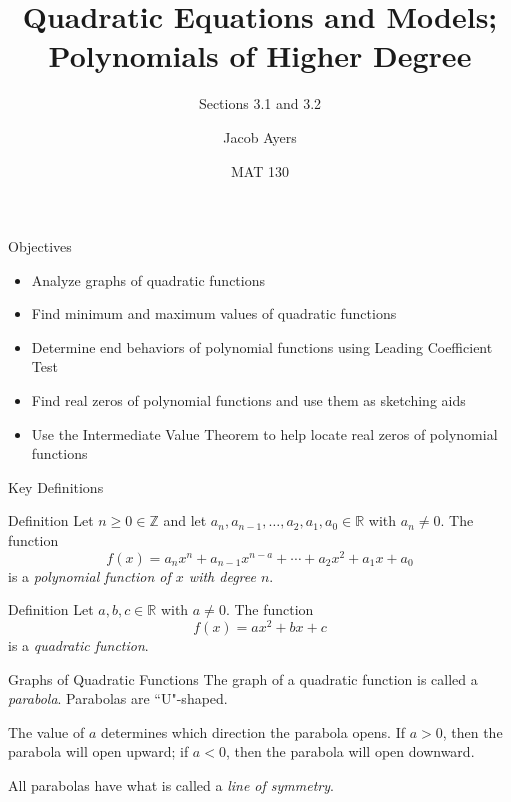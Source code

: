 \documentclass{beamer}
\title[3.1 and 3.2]{Quadratic Equations and Models; Polynomials of Higher Degree}
\subtitle{Sections 3.1 and 3.2}
\author{Jacob Ayers}
\institute{Lesson \#11}
\date{MAT 130}
\def\R{\mathbb{R}} %
\def\Z{\mathbb{Z}} %
\begin{document}
\begin{frame}
\titlepage
\end{frame}

\begin{frame}[t]{Objectives}
\begin{itemize}
	\item Analyze graphs of quadratic functions
	\item Find minimum and maximum values of quadratic functions
	\item Determine end behaviors of polynomial functions using Leading Coefficient Test
	\item Find real zeros of polynomial functions and use them as sketching aids
	\item Use the Intermediate Value Theorem to help locate real zeros of polynomial functions
\end{itemize}
\end{frame}

\begin{frame}[t]{Key Definitions}
\begin{block}{Definition}
Let $n \geq 0 \in \Z$ and let $a_n,a_{n-1},\dots,a_2,a_1,a_0 \in \R$ with $a_n \neq 0$. The function \vspace{-8pt} $$f(x) = a_n x^n + a_{n-1} x^{n-a} + \cdots + a_2 x^2 + a_1 x + a_0$$ is a \textit{polynomial function of $x$ with degree $n$}.
\end{block}

\pause

\begin{block}{Definition}
Let $a,b,c\in\R$ with $a\neq 0$. The function \vspace{-8pt} $$f(x) = ax^2 + bx + c$$ is a \textit{quadratic function}.
\end{block}
\end{frame}

\begin{frame}[t]{Graphs of Quadratic Functions}
The graph of a quadratic function is called a \textit{parabola}. Parabolas are ``U"-shaped.

\pause

The value of $a$ determines which direction the parabola opens. If $a > 0$, then the parabola will open upward; if $a < 0$, then the parabola will open downward.

\pause

All parabolas have what is called a \textit{line of symmetry}.
\end{frame}
\end{document}
